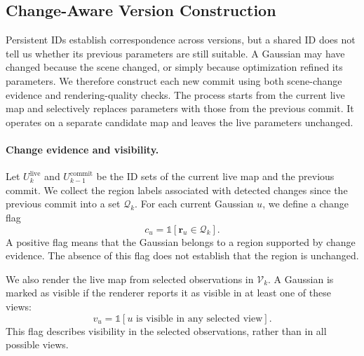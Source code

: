 \subsection{Change-Aware Version Construction}
\label{sec:version_construction}

Persistent IDs establish correspondence across versions, but a shared
ID does not tell us whether its previous parameters are still suitable.
A Gaussian may have changed because the scene changed, or simply
because optimization refined its parameters.
We therefore construct each new commit using both scene-change evidence
and rendering-quality checks.
The process starts from the current live map and selectively replaces
parameters with those from the previous commit.
It operates on a separate candidate map and leaves the live parameters
unchanged.

\paragraph{Change evidence and visibility.}
Let $U_k^{\mathrm{live}}$ and $U_{k-1}^{\mathrm{commit}}$ be the ID sets
of the current live map and the previous commit.
We collect the region labels associated with detected changes since
the previous commit into a set $\mathcal{Q}_k$.
For each current Gaussian $u$, we define a change flag
\begin{equation}
    c_u = \mathbb{1}[\boldsymbol{r}_u \in \mathcal{Q}_k].
\end{equation}
A positive flag means that the Gaussian belongs to a region supported
by change evidence.
The absence of this flag does not establish that the region is unchanged.

We also render the live map from selected observations in
$\mathcal{V}_k$.
A Gaussian is marked as visible if the renderer reports it as visible
in at least one of these views:
\begin{equation}
    v_u =
    \mathbb{1}\!\left[
        u \text{ is visible in any selected view}
    \right].
\end{equation}
This flag describes visibility in the selected observations,
rather than in all possible views.

